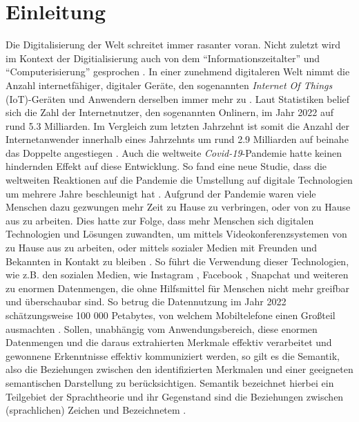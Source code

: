\section{Einleitung}
\label{sec1:intro}
Die Digitalisierung der Welt schreitet immer rasanter voran. Nicht zuletzt wird im Kontext der Digitialisierung auch von dem \enquote{Informationszeitalter} und \enquote{Computerisierung} gesprochen \cite{gabler-digitalisierung}.
In einer zunehmend digitaleren Welt nimmt die Anzahl internetfähiger, digitaler Geräte, den sogenannten \textit{Internet Of Things} (IoT)-Geräten und Anwendern derselben immer mehr zu \cite{statista-iot-devices}.
Laut Statistiken belief sich die Zahl der Internetnutzer, den sogenannten Onlinern, im Jahr 2022 auf rund 5.3 Milliarden. 
Im Vergleich zum letzten Jahrzehnt ist somit die Anzahl der Internetanwender innerhalb eines Jahrzehnts um rund 2.9 Milliarden auf beinahe das Doppelte angestiegen \cite{statista-onliner-2022}.
Auch die weltweite \textit{Covid-19}-Pandemie hatte keinen hindernden Effekt auf diese Entwicklung. 
So fand eine neue Studie, dass die weltweiten Reaktionen auf die Pandemie die Umstellung auf digitale Technologien um mehrere Jahre beschleunigt hat \cite{mckinsey-digitalization-covid}. 
Aufgrund der Pandemie waren viele Menschen dazu gezwungen mehr Zeit zu Hause zu verbringen, oder von zu Hause aus zu arbeiten.
Dies hatte zur Folge, dass mehr Menschen sich digitalen Technologien und Lösungen zuwandten, um mittels Videokonferenzsystemen von zu Hause aus zu arbeiten, oder mittels sozialer Medien mit Freunden und Bekannten in Kontakt zu bleiben \cite{mckinsey-digitalization-covid, statista-covid-social-media-use}.
So führt die Verwendung dieser Technologien, wie z.B. den sozialen Medien, wie Instagram \cite{instagram}, Facebook \cite{facebook}, Snapchat \cite{snapchat} und weiteren zu enormen Datenmengen, die ohne Hilfsmittel für Menschen nicht mehr greifbar und überschaubar sind.
So betrug die Datennutzung im Jahr 2022 schätzungsweise 100 000 Petabytes, von welchem Mobiltelefone einen Großteil ausmachten \cite{global-mobile-data-usage}.
\newline
Sollen, unabhängig vom Anwendungsbereich, diese enormen Datenmengen und die daraus extrahierten Merkmale effektiv verarbeitet und gewonnene Erkenntnisse effektiv kommuniziert werden, so gilt es die Semantik, also die Beziehungen zwischen den identifizierten Merkmalen und einer geeigneten semantischen Darstellung zu berücksichtigen. 
Semantik bezeichnet hierbei ein Teilgebiet der Sprachtheorie und ihr Gegenstand sind die Beziehungen zwischen (sprachlichen) Zeichen und Bezeichnetem \cite{gabler-semantik}.
